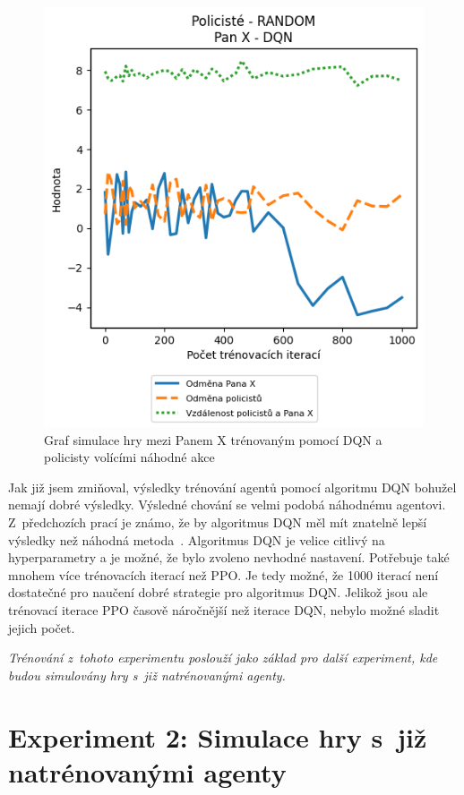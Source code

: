 \begin{figure}[H]
\begin{minipage}{.48\textwidth}
    \includegraphics[width=1\textwidth]{obrazky-figures/graphs/cop_RANDOM_mrx_DQN}
      \caption{Graf simulace hry mezi Panem X trénovaným pomocí DQN a policisty volícími náhodné akce}
      \label{fig:cop_random_mrx_dqn}
  \end{minipage}
  \label{fig:srovnani_dqn}
  \end{figure}

Jak již jsem zmiňoval, výsledky trénování agentů pomocí algoritmu DQN bohužel nemají dobré výsledky.
Výsledné chování se velmi podobá náhodnému agentovi.
Z~předchozích prací je známo, že by algoritmus DQN měl mít znatelně lepší výsledky než náhodná metoda~\cite{Hrklova2023thesis}.
Algoritmus DQN je velice citlivý na hyperparametry a je možné, že bylo zvoleno nevhodné nastavení.
Potřebuje také mnohem více trénovacích iterací než PPO\@.
Je tedy možné, že 1000 iterací není dostatečné pro naučení dobré strategie pro algoritmus DQN\@.
Jelikož jsou ale trénovací iterace PPO časově náročnější než iterace DQN, nebylo možné sladit jejich počet.

\emph{Trénování z~tohoto experimentu poslouží jako základ pro další experiment, kde budou simulovány hry s~již natrénovanými agenty.}

\section{Experiment 2: Simulace hry s~již natrénovanými agenty}
\label{sec:experiment-2}


